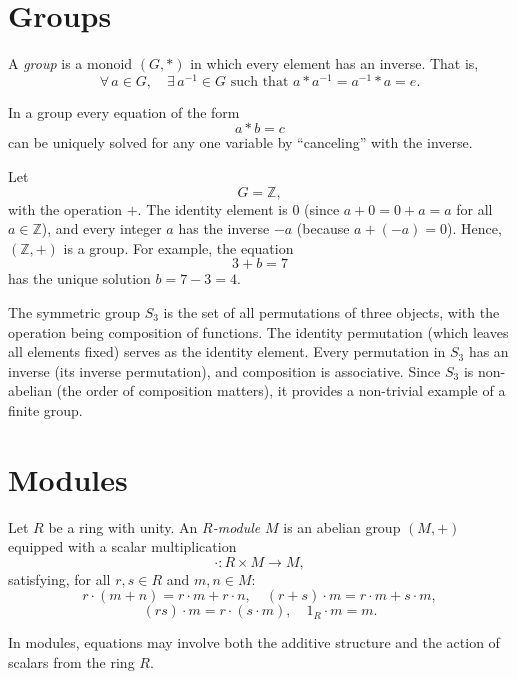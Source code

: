 \documentclass[11pt,openany]{article}
\begin{document}
\section{Groups}
\begin{definition}[Group]
	A \emph{group} is a monoid \((G, \ast)\) in which every element has an inverse. That is,
	\[
	\forall\, a \in G,\quad \exists\, a^{-1} \in G \text{ such that } a\ast a^{-1} = a^{-1}\ast a = e.
	\]
\end{definition}

In a group every equation of the form
\[
a\ast b = c
\]
can be uniquely solved for any one variable by “canceling” with the inverse.

\begin{example}
	Let
	\[
	G = \mathbb{Z},
	\]
	with the operation \(+\). The identity element is \(0\) (since \(a+0=0+a=a\) for all \(a\in\mathbb{Z}\)), and every integer \(a\) has the inverse \(-a\) (because \(a+(-a)=0\)). Hence, \((\mathbb{Z},+)\) is a group. For example, the equation
	\[
	3 + b = 7
	\]
	has the unique solution \(b=7-3=4\).
\end{example}

\begin{example}
	The symmetric group \(S_3\) is the set of all permutations of three objects, with the operation being composition of functions. The identity permutation (which leaves all elements fixed) serves as the identity element. Every permutation in \(S_3\) has an inverse (its inverse permutation), and composition is associative. Since \(S_3\) is non-abelian (the order of composition matters), it provides a non-trivial example of a finite group.
\end{example}

\section{Modules}
\begin{definition}[Module]
	Let \(R\) be a ring with unity. An \emph{\(R\)-module} \(M\) is an abelian group \((M, +)\) equipped with a scalar multiplication
	\[
	\cdot: R \times M \to M,
	\]
	satisfying, for all \(r,s\in R\) and \(m,n\in M\):
	\[
	r\cdot (m+n)=r\cdot m + r\cdot n, \quad (r+s)\cdot m = r\cdot m + s\cdot m,
	\]
	\[
	(rs)\cdot m = r\cdot (s\cdot m), \quad 1_R\cdot m = m.
	\]
\end{definition}

In modules, equations may involve both the additive structure and the action of scalars from the ring \(R\).
\end{document}
